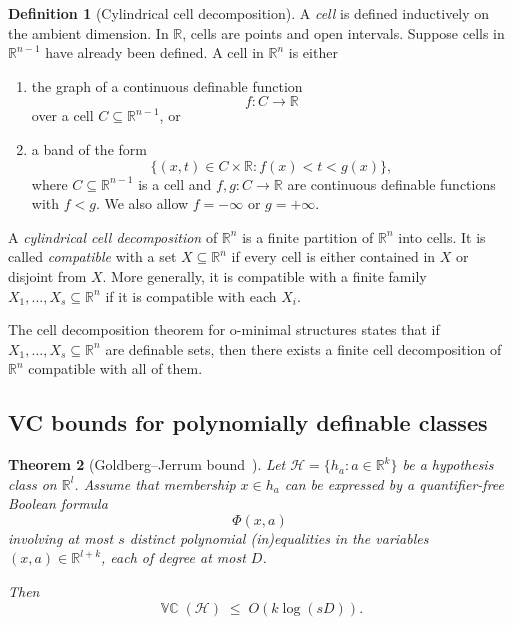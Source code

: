 \documentclass[11pt]{article}
\theoremstyle{plain}
\newtheorem{theorem}{Theorem}[section]
\theoremstyle{definition}
\newtheorem{definition}[theorem]{Definition}
\theoremstyle{remark}
\DeclareMathOperator{\VCdim}{\mathbb{VC}}
\newcommand{\R}{\mathbb{R}}
\begin{document}
\begin{definition}[Cylindrical cell decomposition]
\label{def:cell-decomposition}
A \emph{cell} is defined inductively on the ambient dimension. In \(\R\), cells
are points and open intervals. Suppose cells in \(\R^{n-1}\) have already been
defined. A cell in \(\R^n\) is either

\begin{enumerate}
    \item the graph of a continuous definable function
    \[
      f\colon C\to \R
    \]
    over a cell \(C\subseteq \R^{n-1}\), or

    \item a band of the form
    \[
      \{(x,t)\in C\times \R : f(x)<t<g(x)\},
    \]
    where \(C\subseteq \R^{n-1}\) is a cell and
    \(f,g\colon C\to\R\) are continuous definable functions with \(f<g\).
    We also allow \(f=-\infty\) or \(g=+\infty\).
\end{enumerate}

A \emph{cylindrical cell decomposition} of \(\R^n\) is a finite partition of \(\R^n\) into
cells. It is called \emph{compatible} with a set \(X\subseteq \R^n\) if every
cell is either contained in \(X\) or disjoint from \(X\). More generally, it is
compatible with a finite family \(X_1,\ldots,X_s\subseteq \R^n\) if it is
compatible with each \(X_i\).
\end{definition}

The cell decomposition theorem for o-minimal structures states that if
\(X_1,\ldots,X_s\subseteq \R^n\) are definable sets, then there exists a finite
cell decomposition of \(\R^n\) compatible with all of them.

\subsection{VC bounds for polynomially definable classes}

\begin{theorem}[Goldberg--Jerrum bound~{\cite[Theorem~2.2]{Goldberg1995}}]
\label{thm:GJ-param}
Let $\mathcal H = \{h_a : a \in \R^k\}$ be a hypothesis class on $\R^l$.
Assume that membership $x \in h_a$ can be expressed by a quantifier-free
Boolean formula
\[
\Phi(x,a)
\]
involving at most $s$ distinct polynomial (in)equalities in the variables
$(x,a) \in \R^{l+k}$, each of degree at most $D$.

Then
\[
\VCdim(\mathcal H)
\;\le\;
O\!\left(k \log(sD)\right).
\]
\end{theorem}
\end{document}
